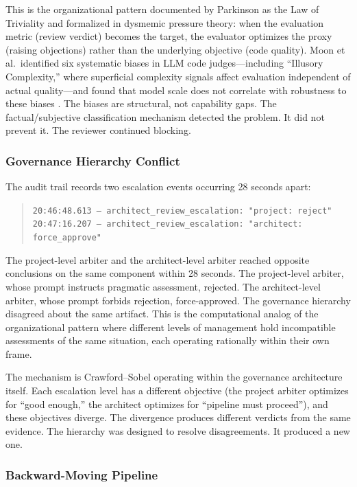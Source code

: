 \documentclass[11pt,a4paper]{article}
\begin{document}
This is the organizational pattern documented by Parkinson as the Law of Triviality and formalized in dysmemic pressure theory: when the evaluation metric (review verdict) becomes the target, the evaluator optimizes the proxy (raising objections) rather than the underlying objective (code quality). Moon et al.\ identified six systematic biases in LLM code judges---including ``Illusory Complexity,'' where superficial complexity signals affect evaluation independent of actual quality---and found that model scale does not correlate with robustness to these biases \citep{moon2025}. The biases are structural, not capability gaps. The factual/subjective classification mechanism detected the problem. It did not prevent it. The reviewer continued blocking.

\subsubsection{Governance Hierarchy Conflict}

The audit trail records two escalation events occurring 28 seconds apart:

\begin{quote}
\texttt{20:46:48.613 --- architect\_review\_escalation: "project: reject"}\\
\texttt{20:47:16.207 --- architect\_review\_escalation: "architect: force\_approve"}
\end{quote}

The project-level arbiter and the architect-level arbiter reached opposite conclusions on the same component within 28 seconds. The project-level arbiter, whose prompt instructs pragmatic assessment, rejected. The architect-level arbiter, whose prompt forbids rejection, force-approved. The governance hierarchy disagreed about the same artifact. This is the computational analog of the organizational pattern where different levels of management hold incompatible assessments of the same situation, each operating rationally within their own frame.

The mechanism is Crawford--Sobel operating within the governance architecture itself. Each escalation level has a different objective (the project arbiter optimizes for ``good enough,'' the architect optimizes for ``pipeline must proceed''), and these objectives diverge. The divergence produces different verdicts from the same evidence. The hierarchy was designed to resolve disagreements. It produced a new one.

\subsubsection{Backward-Moving Pipeline}
\end{document}

